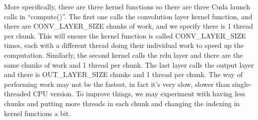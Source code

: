 \documentclass[12pt]{article}
\begin{document}
    More specifically, there are three kernel functions so there are three Cuda launch calls in ``compute()''.
    The first one calls the convolution layer kernel function, and there are CONV\_LAYER\_SIZE chunks of work, and we specify there is 1 thread per chunk.
    This will ensure the kernel function is called CONV\_LAYER\_SIZE times, each with a different thread doing their individual work to speed up the computation.
    Similarly, the second kernel calls the relu layer and there are the same chunks of work and 1 thread per chunk.
    The last layer calls the output layer and there is OUT\_LAYER\_SIZE chunks and 1 thread per chunk.
    The way of performing work may not be the fastest, in fact it's very slow, slower than single-threaded CPU version.
    To improve things, we may experiment with having less chunks and putting more threads in each chunk and changing the indexing in kernel functions a bit.
\end{document}
